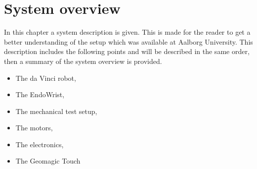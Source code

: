 \chapter{System overview}\label{cha:overview}

In this chapter a system description is given. This is made for the reader to get a better understanding of the setup which was available at Aalborg University. This description includes the following points and will be described in the same order, then a summary of the system overview is provided.

\begin{itemize}
  \item The da Vinci robot,
  \item The EndoWrist,
  \item The mechanical test setup,  
  \item The motors,
  \item The electronics,
  \item The Geomagic Touch
\end{itemize}











%

%




%





